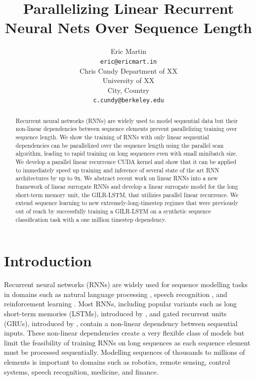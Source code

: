 \documentclass{article}
\title{Parallelizing Linear Recurrent Neural Nets Over Sequence Length}
\author{Eric Martin \\
\texttt{eric@ericmart.in} \\
\And
Chris Cundy
Department of XX \\
University of XX \\
City, Country \\
\texttt{c.cundy@berkeley.edu} \\
}
\begin{document}
\maketitle

\begin{abstract}
Recurrent neural networks (RNNs) are widely used to model sequential data but
their non-linear dependencies between sequence elements prevent parallelizing
training over sequence length. We show the training of RNNs with only linear
sequential dependencies can be parallelized over the sequence length using the
parallel scan algorithm, leading to rapid training on long sequences even with
small minibatch size. We develop a parallel linear recurrence CUDA kernel and
show that it can be applied to immediately speed up training and inference of
several state of the art RNN architectures by up to 9x.  We abstract recent work
on linear RNNs into a new framework of linear surrogate RNNs and develop a
linear surrogate model for the long short-term memory unit, the GILR-LSTM, that
utilizies parallel linear recurrence.  We extend sequence learning to new
extremely-long-timestep regimes that were previously out of reach by
successfully training a GILR-LSTM on a synthetic sequence classification task
with a one million timestep dependency.
\end{abstract}

\section{Introduction}
Recurrent neural networks (RNNs) are widely used for sequence modelling tasks in
domains such as natural language processing \citep{sutskever2014sequence},
speech recognition \citep{amodei2015deep}, and reinforcement learning
\citep{hausknecht2015deep}. Most RNNs, including popular variants such as long
short-term memories (LSTMs), introduced by \citet{hochreiter1997long}, and gated
recurrent units (GRUs), introduced by \citet{cho2014learning}, contain a non-linear dependency
between sequential inputs. These non-linear dependencies create a very flexible
class of models but limit the feasibility of training RNNs on long sequences as
each sequence element must be processed sequentially.  Modelling sequences of
thousands to millions of elements is important to domains such as robotics,
remote sensing, control systems, speech recognition, medicine, and finance.
\end{document}
